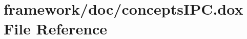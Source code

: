 \hypertarget{concepts_i_p_c_8dox}{}\section{framework/doc/concepts\+I\+PC.dox File Reference}
\label{concepts_i_p_c_8dox}
